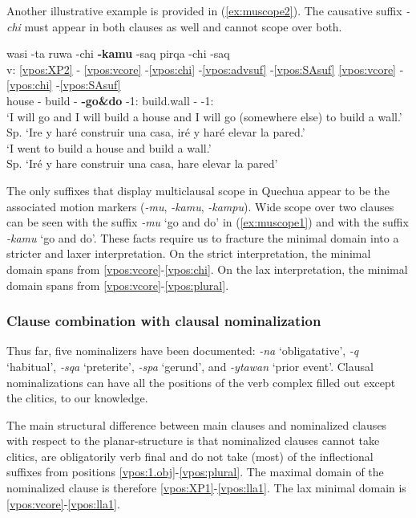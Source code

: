 \documentclass[output=paper]{langscibook}
\begin{document}
Another illustrative example is provided in (\ref{ex:muscope2}). The causative suffix \textit{-chi} must appear in both clauses as well and cannot scope over both.

\ea \label{ex:muscope2}
    \glll {} wasi -ta ruwa -chi \textbf{-kamu} -saq pirqa -chi -saq \\
    v: \ref{vpos:XP2} - \ref{vpos:vcore} -\ref{vpos:chi} -\ref{vpos:advsuf} -\ref{vpos:SAsuf} \ref{vpos:vcore} -\ref{vpos:chi} -\ref{vpos:SAsuf} \\
    {} house -\Acc{} build -\Caus{} \textbf{-go\&do} -1\Sg{}:\Fut{} build.wall -\Caus{} -1\Sg{}:\Fut{}  \\
    \glt `I will go and I will build a house and I will go (somewhere else) to build a wall.' \\ Sp. `Ire y haré construir una casa, iré y haré elevar la pared.' \\ 
    `I went to build a house and build a wall.' \\ Sp. ‘Iré y hare construir una casa, hare elevar la pared'
\z 

The only suffixes that display multiclausal scope in Quechua appear to be the associated motion markers (\textit{-mu}, \textit{-kamu}, \textit{-kampu}). Wide scope over two clauses can be seen with the suffix \textit{-mu} `go and do' in (\ref{ex:muscope1}) and with the suffix \textit{-kamu} `go and do'. These facts require us to fracture the minimal domain into a stricter and laxer interpretation. On the strict interpretation, the minimal domain spans from \ref{vpos:vcore}-\ref{vpos:chi}. On the lax interpretation, the minimal domain spans from \ref{vpos:vcore}-\ref{vpos:plural}.

\subsubsection{Clause combination with clausal nominalization}

Thus far, five nominalizers have been documented: \textit{-na} `obligatative', \textit{-q} `habitual', \textit{-sqa} `preterite', \textit{-spa} `gerund', and \textit{-ytawan} `prior event'. Clausal nominalizations can have all the positions of the verb complex filled out except the clitics, to our knowledge.

The main structural difference between main clauses and nominalized clauses with respect to the planar-structure is that nominalized clauses cannot take clitics, are obligatorily verb final and do not take (most) of the inflectional suffixes from positions \ref{vpos:1.obj}-\ref{vpos:plural}. The maximal domain of the nominalized clause is therefore \ref{vpos:XP1}-\ref{vpos:lla1}. The lax minimal domain is \ref{vpos:vcore}-\ref{vpos:lla1}.
\end{document}
